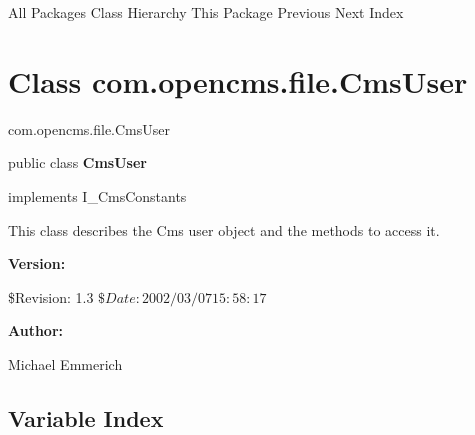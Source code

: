 \begin{PRE}
All Packages  Class Hierarchy  This Package  Previous  Next  Index
\end{PRE}

\htmlHR

\section*{  Class com.opencms.file.CmsUser }

\begin{PRE}
com.opencms.file.CmsUser
\end{PRE}

\htmlHR

\begin{description}
\item public class {\bf CmsUser}  
\item implements I\_CmsConstants 
\end{description}

This class describes the Cms user object and the methods to access it. 

\begin{description}
\item {\bf Version:}  

\$Revision: 1.3 $ \$Date: 2002/03/07 15:58:17 $  
\item {\bf Author:}  

Michael Emmerich 
\end{description}

\htmlHR

\subsection*{  Variable Index }

